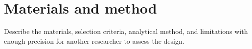 \section{Materials and method}\label{sec:method}

Describe the materials, selection criteria, analytical method, and limitations
with enough precision for another researcher to assess the design.
